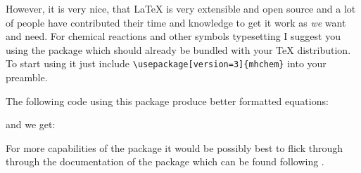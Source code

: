 \documentclass[
]{scrartcl}
\begin{document}
%
However, it is very nice, that \LaTeX{} is very extensible and open source and a
    lot of people have contributed their time and knowledge to get it work as
    \emph{we} want and need.
%
For chemical reactions and other symbols typesetting I suggest you using the
     package which should already be bundled with your \TeX{}
    distribution.
%
To start using it just include \verb|\usepackage[version=3]{mhchem}| into your
    preamble.

%
The following code using this package produce better formatted equations:
%

%
and we get:
%


%
For more capabilities of the package it would be possibly best to flick through
    through the documentation of the package which can be found following
    .
\end{document}
